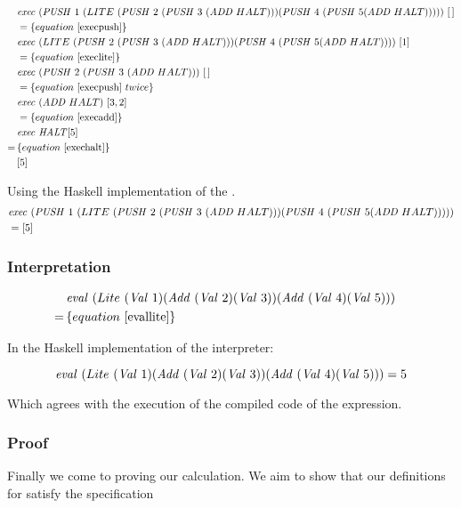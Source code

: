 \documentclass {article}
\begin{document}
\begin{align*}
&\Exec (\PUSH 1\ (LITE\ (\PUSH 2\ (\PUSH 3\ (\ADD  HALT))) (\PUSH 4\ (\PUSH 5 (\ADD  HALT)))))\ [\, ] \\
&=\{equation\ \ref{execpush} \} \\
&\Exec (LITE\ (\PUSH 2\ (\PUSH 3\ (\ADD  HALT))) (\PUSH 4\ (\PUSH 5 (\ADD  HALT))))\ [1] \\
&=\{equation\ \ref{execlite} \} \\
&\Exec (\PUSH 2\ (\PUSH 3\ (\ADD  HALT)))\ [\, ] \\
&=\{equation\ \ref{execpush}\ twice \} \\
&\Exec (\ADD  HALT)\ [3, 2] \\
&=\{equation\ \ref{execadd} \} \\
&\Exec \HALT [5] \\
=\, & \{equation\ \ref{exechalt}\} \\
&[5]
\end{align*}

Using the Haskell implementation of the \vm.
\begin{align*}	
&\Exec (\PUSH 1\ (LITE\ 
	(\PUSH 2\ (\PUSH 3\ (\ADD  HALT))) 
	(\PUSH 4\ (\PUSH 5 (\ADD  HALT))))) \\
&= [5]
\end{align*}

\subsubsection{Interpretation}

\begin{align*}
&\mathit{eval\ }  (Lite\ (\mathit{Val\ } 1) 
		(\mathit{Add\ } (\mathit{Val\ } 2) (\mathit{Val\ } 3)) 
		(\mathit{Add\ } (\mathit{Val\ } 4) (\mathit{Val\ } 5))) \\
=\, & \{ equation\ \ref{evallite} \}
&
\end{align*}

In the Haskell implementation of the
interpreter:

\[ \mathit{eval\ }  (Lite\ (\mathit{Val\ } 1) (\mathit{Add\ } (\mathit{Val\ } 2) (\mathit{Val\ } 3)) (\mathit{Add\ } (\mathit{Val\ } 4) (\mathit{Val\ } 5)))  = 5\]


Which agrees with the execution of the 
compiled code of the expression.

\subsubsection{Proof}

Finally we come to proving our calculation.
We aim to show that our definitions for \lite
satisfy the specification
\end{document}
